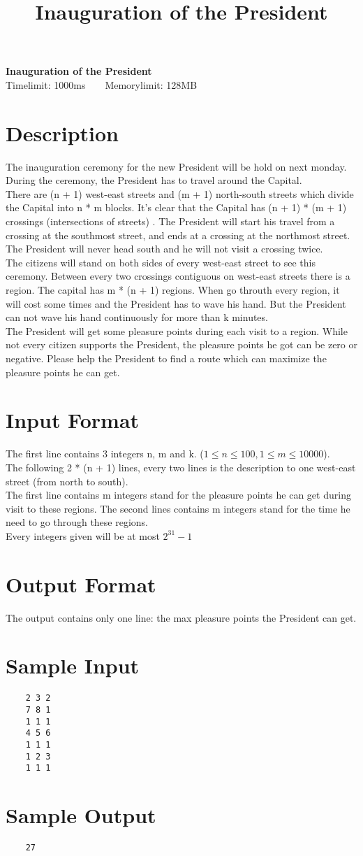 \documentclass{article}
\title{Inauguration of the President}
\begin{document}
\begin{center}
    \LARGE{
        \textbf{Inauguration of the President}
    }\\[0.3cm]
    \small{Timelimit: 1000ms\ \ \ \ Memorylimit: 128MB}
\end{center}
\section{Description}
The inauguration ceremony for the new President will be hold on next monday. During the ceremony, the President has to travel around the Capital. \\
There are (n + 1) west-east streets and (m + 1) north-south streets which divide the Capital into n * m blocks. It's clear that the Capital has (n + 1) * (m + 1) crossings (intersections of streets) . The President will start his travel from a crossing at the southmost street, and ends at a crossing at the northmost street. The President will never head south and he will not visit a crossing twice. \\
The citizens will stand on both sides of every west-east street to see this ceremony. Between every two crossings contiguous on west-east streets there is a region. The capital has m * (n + 1) regions. When go throuth every region, it will cost some times and the President has to wave his hand. But the President can not wave his hand continuously for more than k minutes. \\
The President will get some pleasure points during each visit to a region. While not every citizen supports the President, the pleasure points he got can be zero or negative. Please help the President to find a route which can maximize the pleasure points he can get.
\section{Input Format}
The first line contains 3 integers n, m and k. ($1 \leq n \leq 100, 1 \leq m \leq 10000$). \\
The following 2 * (n + 1) lines, every two lines is the description to one west-east street (from north to south). \\
The first line contains m integers stand for the pleasure points he can get during visit to these regions. The second lines contains m integers stand for the time he need to go through these regions. \\
Every integers given will be at most $2^{31} - 1$
\section{Output Format}
The output contains only one line: the max pleasure points the President can get.
\section{Sample Input}
\begin{verbatim}
    2 3 2
    7 8 1
    1 1 1
    4 5 6
    1 1 1
    1 2 3
    1 1 1
\end{verbatim}
\section{Sample Output}
\begin{verbatim}
    27
\end{verbatim}
\end{document}
